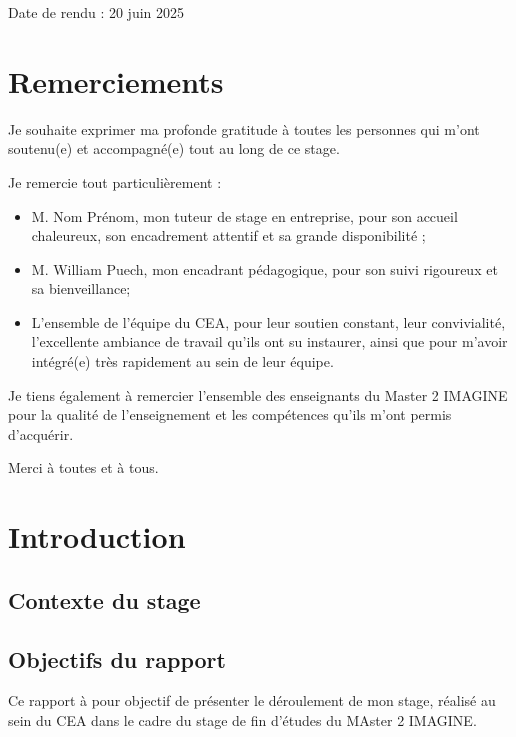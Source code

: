 \documentclass[12pt,a4paper]{report}
\begin{document}
\begin{titlepage}
\begin{center}
\vfill
{\small Date de rendu : 20 juin 2025}

\end{center}
\end{titlepage}

\chapter*{Remerciements}

Je souhaite exprimer ma profonde gratitude à toutes les personnes qui m'ont soutenu(e) et accompagné(e) tout au long de ce stage.

Je remercie tout particulièrement :
\begin{itemize}
  \item M. Nom Prénom, mon tuteur de stage en entreprise, pour son accueil chaleureux, son encadrement attentif et sa grande disponibilité ;
  \item M. William Puech, mon encadrant pédagogique, pour son suivi rigoureux et sa bienveillance;
  \item L’ensemble de l’équipe du CEA, pour leur soutien constant, leur convivialité, l’excellente ambiance de travail qu’ils ont su instaurer, ainsi que pour m’avoir intégré(e) très rapidement au sein de leur équipe.
\end{itemize}

Je tiens également à remercier l’ensemble des enseignants du Master 2 IMAGINE pour la qualité de l’enseignement et les compétences qu’ils m’ont permis d’acquérir.

\vspace{1em}
Merci à toutes et à tous.


\tableofcontents
\pagestyle{fancy}
\newpage


\chapter{Introduction}
\section{Contexte du stage}
\section{Objectifs du rapport}
Ce rapport à pour objectif de présenter le déroulement de mon stage, réalisé au sein du CEA dans le cadre du stage de fin d'études du MAster 2 IMAGINE.
\end{document}
